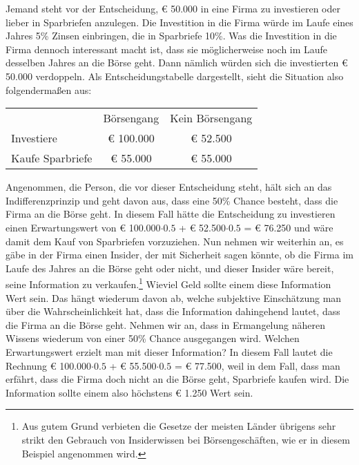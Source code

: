 Jemand steht vor der Entscheidung, € 50.000 in eine Firma zu investieren oder
lieber in Sparbriefen anzulegen. Die Investition in die Firma würde im Laufe
eines Jahres 5\% Zinsen einbringen, die in Sparbriefe 10\%. Was die Investition
in die Firma dennoch interessant macht ist, dass sie möglicherweise noch im
Laufe desselben Jahres an die Börse geht. Dann nämlich würden sich die
investierten € 50.000 verdoppeln. Als Entscheidungstabelle dargestellt, sieht
die Situation also folgendermaßen aus:

\begin{center}
\begin{tabular}{l|c|c|}
\multicolumn{1}{c}{} & \multicolumn{1}{c}{Börsengang} & \multicolumn{1}{c}{Kein
Börsengang} \\
\cline{2-3}
Investiere           & € 100.000                      & € 52.500 \\
\cline{2-3}
Kaufe Sparbriefe     & € 55.000                       & € 55.000 \\
\cline{2-3}
\end{tabular}
\end{center}

Angenommen, die Person, die vor dieser Entscheidung steht, hält sich an das
Indifferenzprinzip und geht davon aus, dass eine 50\% Chance besteht, dass die
Firma an die Börse geht. In diesem Fall hätte die Entscheidung zu investieren
einen Erwartungswert von € 100.000$\cdot 0.5$ + € 52.500$\cdot 0.5$ = € 76.250
und wäre damit dem Kauf von Sparbriefen vorzuziehen. Nun nehmen wir weiterhin an,
es gäbe in der Firma einen Insider, der mit Sicherheit sagen könnte, ob die Firma
im Laufe des Jahres an die Börse geht oder nicht, und dieser Insider wäre bereit,
seine Information zu verkaufen.\footnote{Aus gutem Grund verbieten die Gesetze
der meisten Länder übrigens sehr strikt den Gebrauch von Insiderwissen bei
Börsengeschäften, wie er in diesem Beispiel angenommen wird.} Wieviel Geld sollte
einem diese Information Wert sein. Das hängt wiederum davon ab, welche subjektive
Einschätzung man über die Wahrscheinlichkeit hat, dass die Information
dahingehend lautet, dass die Firma an die Börse geht. Nehmen wir an, dass in
Ermangelung näheren Wissens wiederum von einer 50\% Chance ausgegangen wird.
Welchen Erwartungswert erzielt man mit dieser Information? In diesem Fall lautet
die Rechnung € 100.000$\cdot 0.5$ + € 55.500$\cdot 0.5$ = € 77.500, weil in dem
Fall, dass man erfährt, dass die Firma doch nicht an die Börse geht, Sparbriefe
kaufen wird. Die Information sollte einem also höchstens € 1.250 Wert sein.

